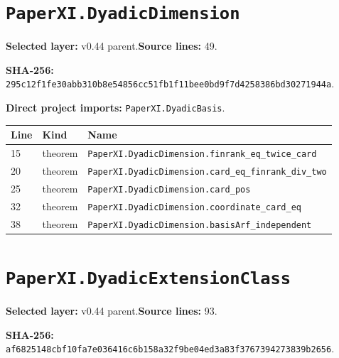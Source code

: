 \documentclass[10pt,oneside]{book}
\begin{document}
\section{\texorpdfstring{\nolinkurl{PaperXI.DyadicDimension}}{PaperXI.DyadicDimension}}\label{module:PaperXI.DyadicDimension}

\textbf{Selected layer:} v0.44 parent.\quad\textbf{Source lines:} 49.\par\textbf{SHA-256:} {\scriptsize\nolinkurl{295c12f1fe30abb310b8e54856cc51fb1f11bee0bd9f7d4258386bd30271944a}}.


\textbf{Direct project imports:} \nolinkurl{PaperXI.DyadicBasis}.

\begin{longtable}{@{}p{}p{}p{}@{}}\toprule Line&Kind&Name\\\midrule\endhead

15&theorem&\nolinkurl{PaperXI.DyadicDimension.finrank_eq_twice_card}\\

20&theorem&\nolinkurl{PaperXI.DyadicDimension.card_eq_finrank_div_two}\\

25&theorem&\nolinkurl{PaperXI.DyadicDimension.card_pos}\\

32&theorem&\nolinkurl{PaperXI.DyadicDimension.coordinate_card_eq}\\

38&theorem&\nolinkurl{PaperXI.DyadicDimension.basisArf_independent}\\

\bottomrule\end{longtable}

\section{\texorpdfstring{\nolinkurl{PaperXI.DyadicExtensionClass}}{PaperXI.DyadicExtensionClass}}\label{module:PaperXI.DyadicExtensionClass}

\textbf{Selected layer:} v0.44 parent.\quad\textbf{Source lines:} 93.\par\textbf{SHA-256:} {\scriptsize\nolinkurl{af6825148cbf10fa7e036416c6b158a32f9be04ed3a83f3767394273839b2656}}.

\end{document}
